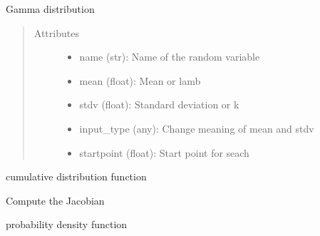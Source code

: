 \documentclass[letterpaper,10pt,english]{sphinxmanual}
\begin{document}
\begin{fulllineitems}
Gamma distribution
\begin{quote}\begin{description}
\item[{Attributes }] \leavevmode\begin{itemize}
\item {} 
name (str):         Name of the random variable

\item {} 
mean (float):       Mean or lamb

\item {} 
stdv (float):       Standard deviation or k

\item {} 
input\_type (any):   Change meaning of mean and stdv

\item {} 
startpoint (float): Start point for seach

\end{itemize}

\end{description}\end{quote}


\begin{fulllineitems}
cumulative distribution function

\end{fulllineitems}



\begin{fulllineitems}
Compute the Jacobian

\end{fulllineitems}



\begin{fulllineitems}
probability density function

\end{fulllineitems}




\end{fulllineitems}
\end{document}
